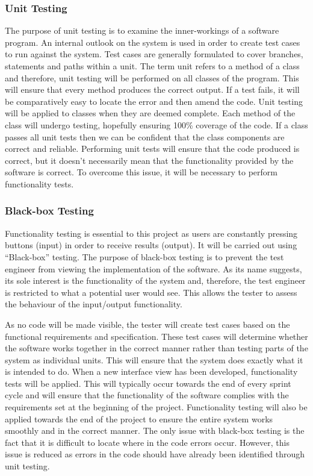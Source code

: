 \documentclass[11pt,a4paper]{article}
\begin{document}
\subsubsection{Unit Testing} 
The purpose of unit testing is to examine the inner-workings of a software program. An internal outlook on the system is used in order to create test cases to run against the system. Test cases are generally formulated to cover branches, statements and paths within a unit. The term unit refers to a method of a class and therefore, unit testing will be performed on all classes of the program. This will ensure that every method produces the correct output. If a test fails, it will be comparatively easy to locate the error and then amend the code. Unit testing will be applied to classes when they are deemed complete. Each method of the class will undergo testing, hopefully ensuring 100\% coverage of the code. If a class passes all unit tests then we can be confident that the class components are correct and reliable. Performing unit tests will ensure that the code produced is correct, but it doesn't necessarily mean that the functionality provided by the software is correct. To overcome this issue, it will be necessary to perform functionality tests.

\subsubsection{Black-box Testing}
Functionality testing is essential to this project as users are constantly pressing buttons (input) in order to receive results (output). It will be carried out using ``Black-box'' testing. The purpose of black-box testing is to prevent the test engineer from viewing the implementation of the software. As its name suggests, its sole interest is the functionality of the system and, therefore, the test engineer is restricted to what a potential user would see. This allows the tester to assess the behaviour of the input/output functionality.

As no code will be made visible, the tester will create test cases based on the functional requirements and specification. These test cases will determine whether the software works together in the correct manner rather than testing parts of the system as individual units. This will ensure that the system does exactly what it is intended to do. When a new interface view has been developed, functionality tests will be applied. This will typically occur towards the end of every sprint cycle and will ensure that the functionality of the software complies with the requirements set at the beginning of the project. Functionality testing will also be applied towards the end of the project to ensure the entire system works smoothly and in the correct manner. The only issue with black-box testing is the fact that it is difficult to locate where in the code errors occur. However, this issue is reduced as errors in the code should have already been identified through unit testing.
\end{document}
